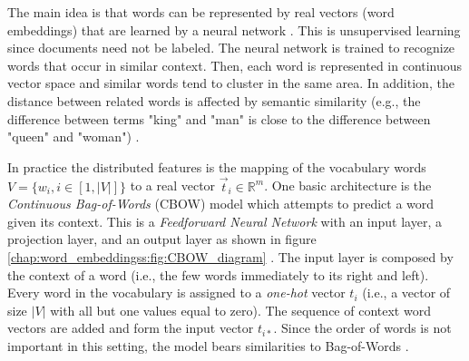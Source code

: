 The main idea is that words can be represented by real vectors (word embeddings) that are learned by a neural network \parencite{mikolov2013efficient}. This is unsupervised learning since documents need not be labeled. The neural network is trained to recognize words that occur in similar context. Then, each word is represented in continuous vector space and similar words tend to cluster in the same area. In addition, the distance between related words is affected by semantic similarity (e.g., the difference between terms "king" and "man" is close to the difference between "queen" and "woman") \parencite{mikolov2013efficient}. 



In practice the distributed features is the mapping of the vocabulary words $V = \{w_{i}, i \in [1, |V|] \}$ to a real vector $\vec{t}_i \in \mathbb{R}^{m}$. One basic architecture is the \textit{Continuous Bag-of-Words} (CBOW) model which attempts to predict a word given its context. This is a \textit{Feedforward Neural Network} with an input layer, a projection layer, and an output layer as shown in figure \ref{chap:word_embeddingss:fig:CBOW_diagram} \parencite{mitra2018introduction}. The input layer is composed by the context of a word (i.e., the few words immediately to its right and left). Every word in the vocabulary is assigned to a \textit{one-hot} vector $t_{i}$ (i.e., a vector of size $|V|$ with all but one values equal to zero). The sequence of context word vectors are added and form the input vector $t_{i*}$. Since the order of words is not important in this setting, the model bears similarities to Bag-of-Words \parencite{mitra2018introduction}.

